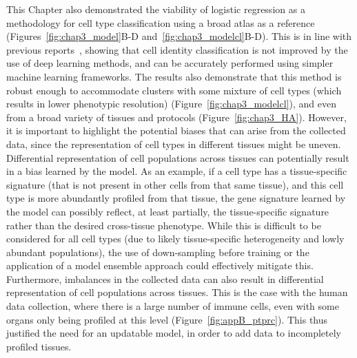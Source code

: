 This Chapter also demonstrated the viability of logistic regression as a methodology for cell type classification using a broad atlas as a reference (Figures~\ref{fig:chap3_model}B-D and~\ref{fig:chap3_modelcl}B-D). This is in line with previous reports~\citep{kohler_deep_2019,abdelaal_comparison_2019}, showing that cell identity classification is not improved by the use of deep learning methods, and can be accurately performed using simpler machine learning frameworks. The results also demonstrate that this method is robust enough to accommodate clusters with some mixture of cell types (which results in lower phenotypic resolution) (Figure~\ref{fig:chap3_modelcl}), and even from a broad variety of tissues and protocols (Figure~\ref{fig:chap3_HA}). However, it is important to highlight the potential biases that can arise from the collected data, since the representation of cell types in different tissues might be uneven. Differential representation of cell populations across tissues can potentially result in a bias learned by the model. As an example, if a cell type has a tissue-specific signature (that is not present in other cells from that same tissue), and this cell type is more abundantly profiled from that tissue, the gene signature learned by the model can possibly reflect, at least partially, the tissue-specific signature rather than the desired cross-tissue phenotype. While this is difficult to be considered for all cell types (due to likely tissue-specific heterogeneity and lowly abundant populations), the use of down-sampling before training or the application of a model ensemble approach could effectively mitigate this. Furthermore, imbalances in the collected data can also result in differential representation of cell populations across tissues. This is the case with the human data collection, where there is a large number of immune cells, even with some organs only being profiled at this level (Figure~\ref{fig:appB_ptprc}). This thus justified the need for an updatable model, in order to add data to incompletely profiled tissues.

